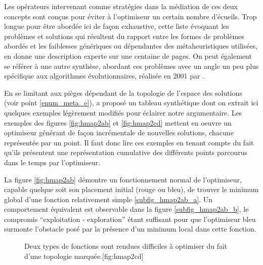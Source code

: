 Les opérateurs intervenant comme stratégies dans la médiation de ces deux concepts sont conçus pour éviter à l'optimiseur un certain nombre d'écueils. Trop longue pour être abordée ici de façon exhaustive, cette liste évoquant les problèmes et solutions qui résultent du rapport entre les formes de problèmes abordés et les faiblesses génériques ou dépendantes des métaheuristiques utilisées, \textcite{Weise2011} en donne une description experte sur une centaine de pages. On peut également se référer à une autre synthèse, abordant ces problèmes avec un angle un peu plus spécifique aux algorithmes évolutionnaires, réalisée en 2001 par \textcite[316-445]{Deb2001}.

En se limitant aux pièges dépendant de la topologie de l'espace des solutions (voir point \ref{enum_meta_e}), \textcite[140]{Weise2011} a proposé un tableau synthétique dont on extrait ici quelques exemples légèrement modifiés pour éclairer notre argumentaire. Les exemples des figures \ref{fig:hmap2ab} et \ref{fig:hmap2cd} mettent en oeuvre un optimiseur générant de façon incrémentale de nouvelles solutions, chacune représentée par un point. Il faut donc lire ces exemples en tenant compte du fait qu'ils présentent une représentation cumulative des différents points parcourus dans le temps par l'optimiseur.

La figure \ref{fig:hmap2ab} démontre un fonctionnement normal de l'optimiseur, capable quelque soit son placement initial (rouge ou bleu), de trouver le minimum global d'une fonction relativement simple \ref{subfig_hmap2ab_a}. Un comportement équivalent est observable dans la figure \ref{subfig_hmap2ab_b}, le compromis \enquote{exploitation - exploration} étant suffisant pour que l'optimiseur bleu surmonte l'obstacle posé par la présence d'un minimum local dans cette fonction.

\begin{figure}[!htbp]
  \begin{sidecaption}[fortoc]{Deux types de fonctions sont rendues difficiles à optimiser du fait d'une topologie marquée.}[fig:hmap2cd]
  \centering
  \qquad
 \end{sidecaption}
\end{figure}

